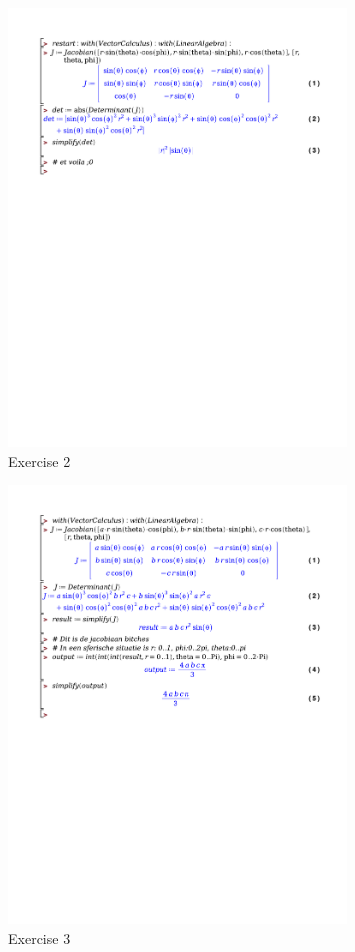 \documentclass[a4paper]{report}
\begin{document}
\begin{figure}[H]
	\centering
	\includegraphics[width=0.8\textwidth]{exercises/huis_5_ex_2.pdf}
	\caption{Exercise 2}
	\label{fig:huis_5_ex_2}
\end{figure}

\begin{figure}[H]
	\centering
	\includegraphics[width=0.8\textwidth]{exercises/huis_5_ex_3.pdf}
	\caption{Exercise 3}
	\label{fig:huis_5_ex_3}
\end{figure}
\end{document}
